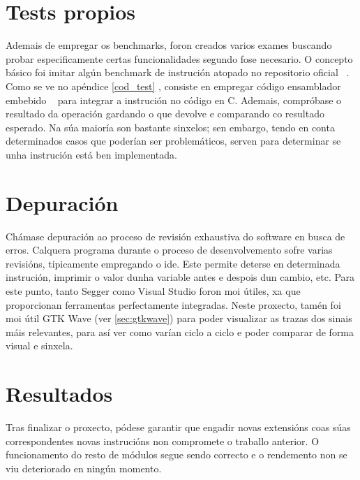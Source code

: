 \section{Tests propios}\label{sec:tests}
Ademais de empregar os benchmarks, foron creados varios exames buscando probar especificamente certas funcionalidades segundo fose necesario. O concepto básico foi imitar algún benchmark de instrución atopado no repositorio oficial ~\cite{riscv_tests}. Como se ve no apéndice \ref{cod_test} , consiste en empregar código ensamblador embebido ~\cite{asm_emb} para integrar a instrución no código en C. Ademais, compróbase o resultado da operación gardando o que devolve e comparando co resultado esperado. Na súa maioría son bastante sinxelos; sen embargo, tendo en conta determinados casos que poderían ser problemáticos, serven para determinar se unha instrución está ben implementada.


\section{Depuración}\label{sec:depuración}
Chámase depuración ao proceso de revisión exhaustiva do software en busca de erros. Calquera programa durante o proceso de desenvolvemento sofre varias revisións, tipicamente empregando o \acrshort{ide}. Este permite deterse en determinada instrución, imprimir o valor dunha variable antes e despois dun cambio, etc. Para este punto, tanto Segger como Visual Studio foron moi útiles, xa que proporcionan ferramentas perfectamente integradas. Neste proxecto, tamén foi moi útil GTK Wave (ver \ref{sec:gtkwave}) para poder visualizar as trazas dos sinais máis relevantes, para así ver como varían ciclo a ciclo e poder comparar de forma visual e sinxela.

\section{Resultados}\label{chap:resultados}
Tras finalizar o proxecto, pódese garantir que engadir novas extensións coas súas correspondentes novas instrucións non compromete o traballo anterior. O funcionamento do resto de módulos segue sendo correcto e o rendemento non se viu deteriorado en ningún momento.

